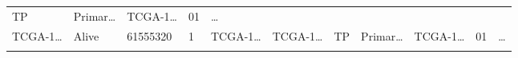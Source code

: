 \documentclass[
]{article}
\begin{document}
\begin{longtable}[]{@{}lllllllllll@{}}
\begin{minipage}[t]{0.07\columnwidth}
TP\strut
\end{minipage} & \begin{minipage}[t]{0.07\columnwidth}\raggedright
Primar\ldots{}\strut
\end{minipage} & \begin{minipage}[t]{0.09\columnwidth}\raggedright
TCGA-1\ldots{}\strut
\end{minipage} & \begin{minipage}[t]{0.10\columnwidth}\raggedright
01\strut
\end{minipage} & \begin{minipage}[t]{0.03\columnwidth}\raggedright
\ldots{}\strut
\end{minipage}\tabularnewline
\begin{minipage}[t]{0.07\columnwidth}\raggedright
TCGA-1\ldots{}\strut
\end{minipage} & \begin{minipage}[t]{0.04\columnwidth}\raggedright
Alive\strut
\end{minipage} & \begin{minipage}[t]{0.06\columnwidth}\raggedright
61555320\strut
\end{minipage} & \begin{minipage}[t]{0.07\columnwidth}\raggedright
1\strut
\end{minipage} & \begin{minipage}[t]{0.07\columnwidth}\raggedright
TCGA-1\ldots{}\strut
\end{minipage} & \begin{minipage}[t]{0.07\columnwidth}\raggedright
TCGA-1\ldots{}\strut
\end{minipage} & \begin{minipage}[t]{0.07\columnwidth}\raggedright
TP\strut
\end{minipage} & \begin{minipage}[t]{0.07\columnwidth}\raggedright
Primar\ldots{}\strut
\end{minipage} & \begin{minipage}[t]{0.09\columnwidth}\raggedright
TCGA-1\ldots{}\strut
\end{minipage} & \begin{minipage}[t]{0.10\columnwidth}\raggedright
01\strut
\end{minipage} & \begin{minipage}[t]{0.03\columnwidth}\raggedright
\ldots{}\strut
\end{minipage}\tabularnewline
\begin{minipage}[t]{0.07\columnwidth}\raggedright

\end{minipage}
\end{longtable}
\end{document}
